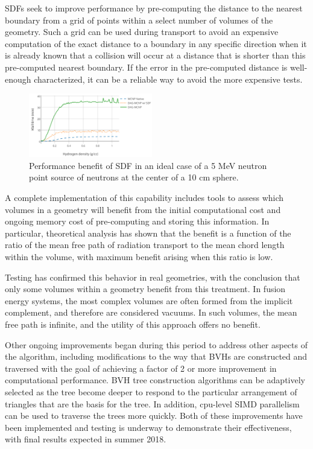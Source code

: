 \glspl{SDF} seek to improve performance by pre-computing the distance to the
nearest boundary from a grid of points within a select number of volumes of
the geometry.  Such a grid can be used during transport to avoid an expensive
computation of the exact distance to a boundary in any specific direction when
it is already known that a collision will occur at a distance that is shorter
than this pre-computed nearest boundary.  If the error in the pre-computed
distance is well-enough characterized, it can be a reliable way to avoid the
more expensive tests.

\begin{figure}
\centering
\includegraphics[width=0.48\textwidth]{imgs/sdf-best-case.png}
\caption{\label{fig:sdf-best-case}Performance benefit of \gls{SDF} in an ideal
  case of a 5 MeV neutron point source of neutrons at the center of a 10 cm
  sphere.\cite{shriwise_NET}}
\end{figure}

A complete implementation of this capability includes tools to assess which
volumes in a geometry will benefit from the initial computational cost and
ongoing memory cost of pre-computing and storing this information.  In
particular, theoretical analysis has shown that the benefit is a function of
the ratio of the mean free path of radiation transport to the mean chord
length within the volume, with maximum benefit arising when this ratio is
low.\cite{shriwise_NET}

Testing has confirmed this behavior in real geometries, with the conclusion
that only some volumes within a geometry benefit from this treatment.  In
fusion energy systems, the most complex volumes are often formed from the
implicit complement, and therefore are considered vacuums.  In such volumes,
the mean free path is infinite, and the utility of this approach offers no
benefit.

Other ongoing improvements began during this period to address other aspects
of the algorithm, including modifications to the way that \glspl{BVH} are
constructed and traversed with the goal of achieving a factor of 2 or more
improvement in computational performance.  \gls{BVH} tree construction
algorithms can be adaptively selected as the tree become deeper to respond to
the particular arrangement of triangles that are the basis for the tree.  In
addition, cpu-level \gls{SIMD} parallelism can be used to traverse the trees
more quickly.\cite{embree}  Both of these improvements have been implemented
and testing is underway to demonstrate their effectiveness, with final results
expected in summer 2018.


